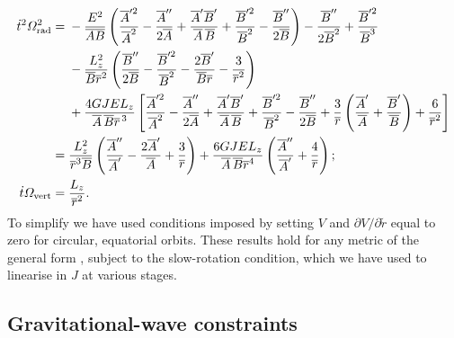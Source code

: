 \begin{align}
\dot{t}^2\Omega_\mathrm{rad}^2 = {} & -\frac{E^2}{\overline{A}\overline{B}} \left( \frac{\overline{A}'^2}{\overline{A}^2} - \frac{\overline{A}''}{2\overline{A}} + \frac{\overline{A}'\overline{B}'}{\overline{A}\,\overline{B}} + \frac{\overline{B}'^2}{\overline{B}^2} - \frac{\overline{B}''}{2\overline{B}} \right) - \frac{\overline{B}''}{2\overline{B}^2} +  \frac{\overline{B}'^2}{\overline{B}^3} \nonumber \\*
 & - {} \frac{L_z^2}{\overline{B}\overline{r}^2} \left(\frac{\overline{B}''}{2\overline{B}} - \frac{\overline{B}'^2}{\overline{B}^2} - \frac{2\overline{B}'}{\overline{B}\overline{r}}-\frac{3}{\overline{r}^2} \right) \nonumber \\
  & + \frac{4GJEL_z}{\overline{A}\,\overline{B}\overline{r}^{\,3}} \left[ \frac{\overline{A}'^2}{\overline{A}^2} - \frac{\overline{A}''}{2\overline{A}} + \frac{\overline{A}'\overline{B}'}{\overline{A}\,\overline{B}} + \frac{\overline{B}'^2}{\overline{B}^2} - \frac{\overline{B}''}{2\overline{B}} + \frac{3}{\overline{r}}\left(\frac{\overline{A}'}{\overline{A}}+\frac{\overline{B}'}{\overline{B}}\right) + \frac{6}{\overline{r}^2}\right] \label{eq:long_epi} \\
 = {} &  \frac{L_z^2}{\overline{r}^3\overline{B}}\left(\frac{\overline{A}''}{\overline{A}'} - \frac{2\overline{A}'}{\overline{A}} + \frac{3}{\overline{r}}\right) +\frac{6GJEL_z}{\overline{A}\,\overline{B} \overline{r}^4} \left(\frac{\overline{A}''}{\overline{A}'} + \frac{4}{\overline{r}}\right); \\
\dot{t}\Omega_\mathrm{vert} = {} & \frac{L_z}{\overline{r}^2}.
\end{align}
To simplify  we have used conditions imposed by setting $V$ and $\partial V/\partial \widetilde{r}$ equal to zero for circular, equatorial orbits. These results hold for any metric of the general form , subject to the slow-rotation condition, which we have used to linearise in $J$ at various stages.

\subsection{Gravitational-wave constraints}

